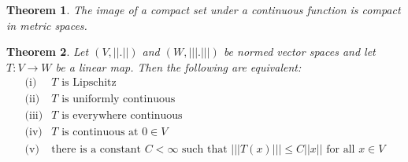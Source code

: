 \documentclass{article}
\newtheorem{theorem}{Theorem}[section]
\theoremstyle{definition}
\begin{document}
    \begin{theorem}
        The image of a compact set under a continuous function is compact in metric spaces.
    \end{theorem}

    \begin{theorem}
        Let $(V, ||.||)$ and $(W, |||.|||)$ be normed vector spaces and let $T:V \rightarrow W$ be a linear map. Then the 
        following are equivalent:
        \begin{align*}
            \text{(i)} & \text{$T$ is Lipschitz} \\
            \text{(ii)} & \text{$T$ is uniformly continuous}\\
            \text{(iii)} & \text{$T$ is everywhere continuous}\\
            \text{(iv)} & \text{$T$ is continuous at $0 \in V$}\\
            \text{(v)} & \text{there is a constant $C < \infty$ such that $|||T(x)||| \leqslant C||x||$ for all $x \in V$}
        \end{align*}

    \end{theorem}

    
\end{document}
